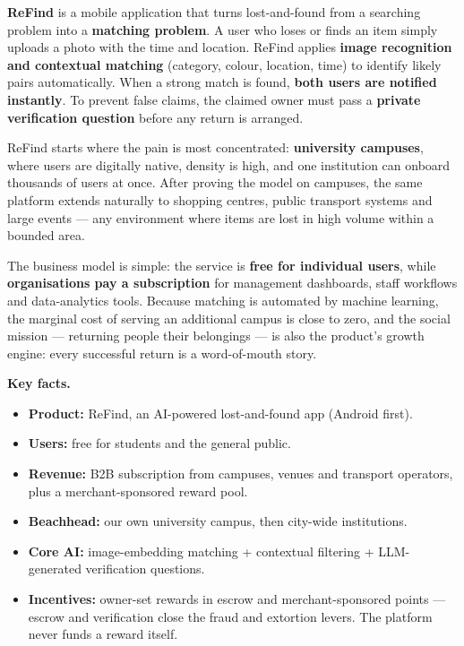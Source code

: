 \documentclass[11pt,a4paper]{article}
\begin{document}
\textbf{ReFind} is a mobile application that turns lost-and-found from a searching problem
into a \textbf{matching problem}. A user who loses or finds an item simply uploads a photo
with the time and location. ReFind applies \textbf{image recognition and contextual
matching} (category, colour, location, time) to identify likely pairs automatically. When a
strong match is found, \textbf{both users are notified instantly}. To prevent false claims,
the claimed owner must pass a \textbf{private verification question} before any return is
arranged.

ReFind starts where the pain is most concentrated: \textbf{university campuses}, where users
are digitally native, density is high, and one institution can onboard thousands of users at
once. After proving the model on campuses, the same platform extends naturally to shopping
centres, public transport systems and large events --- any environment where items are lost
in high volume within a bounded area.

The business model is simple: the service is \textbf{free for individual users}, while
\textbf{organisations pay a subscription} for management dashboards, staff workflows and
data-analytics tools. Because matching is automated by machine learning, the marginal cost
of serving an additional campus is close to zero, and the social mission --- returning
people their belongings --- is also the product's growth engine: every successful return is
a word-of-mouth story.

\begin{highlight}
\textbf{Key facts.}
\begin{itemize}[leftmargin=1.2em,itemsep=2pt,topsep=3pt]
  \item \textbf{Product:} ReFind, an AI-powered lost-and-found app (Android first).
  \item \textbf{Users:} free for students and the general public.
  \item \textbf{Revenue:} B2B subscription from campuses, venues and transport operators,
        plus a merchant-sponsored reward pool.
  \item \textbf{Beachhead:} our own university campus, then city-wide institutions.
  \item \textbf{Core AI:} image-embedding matching + contextual filtering + LLM-generated
        verification questions.
  \item \textbf{Incentives:} owner-set rewards in escrow and merchant-sponsored points ---
        escrow and verification close the fraud and extortion levers. The platform never
        funds a reward itself.
\end{itemize}
\end{highlight}
\end{document}
